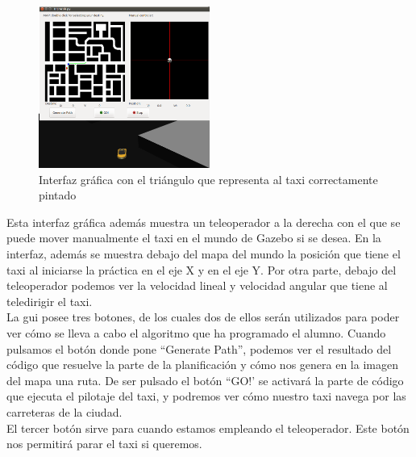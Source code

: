 \begin{figure}[H]
  \begin{center}
    \includegraphics[width=0.5\textwidth]{figures/GPP/triangulo_giro_correcto.png}
		\caption{Interfaz gráfica con el triángulo que representa al taxi correctamente pintado}
		\label{fig.triangulo_giro_correcto}
		\end{center}
\end{figure}

Esta interfaz gráfica además muestra un teleoperador a la derecha con el que se puede mover manualmente el taxi en el mundo de Gazebo si se desea. En la interfaz, además se muestra debajo del mapa del mundo la posición que tiene el taxi al iniciarse la práctica en el eje X y en el eje Y. Por otra parte, debajo del teleoperador podemos ver la velocidad lineal y velocidad angular que tiene al teledirigir el taxi.\\

La \acrshort{gui} posee tres botones, de los cuales dos de ellos serán utilizados para poder ver cómo se lleva a cabo el algoritmo que ha programado el alumno. Cuando pulsamos el botón donde pone ``Generate Path'', podemos ver el resultado del código que resuelve la parte de la planificación y cómo nos genera en la imagen del mapa una ruta. De ser pulsado el botón ``GO!' se activará la parte de código que ejecuta el pilotaje del taxi, y podremos ver cómo nuestro taxi navega por las carreteras de la ciudad.\\

El tercer botón sirve para cuando estamos empleando el teleoperador. Este botón nos permitirá parar el taxi si queremos.\\

